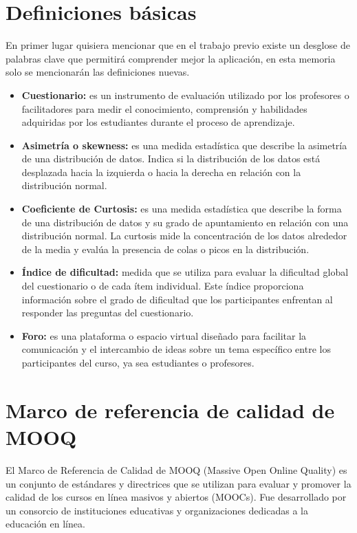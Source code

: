 

\section{Definiciones básicas}

En primer lugar quisiera mencionar que en el trabajo previo existe un desglose de palabras clave que permitirá comprender mejor la aplicación, en esta memoria solo se mencionarán las definiciones nuevas.

\begin{itemize}
	\item \textbf{Cuestionario:} es un instrumento de evaluación utilizado por los profesores o facilitadores para medir el conocimiento, comprensión y habilidades adquiridas por los estudiantes durante el proceso de aprendizaje\cite{Lissette}.
	\item \textbf{Asimetría o skewness:} es una medida estadística que describe la asimetría de una distribución de datos. Indica si la distribución de los datos está desplazada hacia la izquierda o hacia la derecha en relación con la distribución normal.
	\item \textbf{Coeficiente de Curtosis:} es una medida estadística que describe la forma de una distribución de datos y su grado de apuntamiento en relación con una distribución normal. La curtosis mide la concentración de los datos alrededor de la media y evalúa la presencia de colas o picos en la distribución. 
	\item \textbf{Índice de dificultad:} medida que se utiliza para evaluar la dificultad global del cuestionario o de cada ítem individual. Este índice proporciona información sobre el grado de dificultad que los participantes enfrentan al responder las preguntas del cuestionario.
	\item \textbf{Foro:} es una plataforma o espacio virtual diseñado para facilitar la comunicación y el intercambio de ideas sobre un tema específico entre los participantes del curso, ya sea estudiantes o profesores.  
\end{itemize}


\section{Marco de referencia de calidad de MOOQ}
El Marco de Referencia de Calidad de MOOQ (Massive Open Online Quality) es un conjunto de estándares y directrices que se utilizan para evaluar y promover la calidad de los cursos en línea masivos y abiertos (MOOCs). Fue desarrollado por un consorcio de instituciones educativas y organizaciones dedicadas a la educación en línea\cite{stracke2018quality}.

